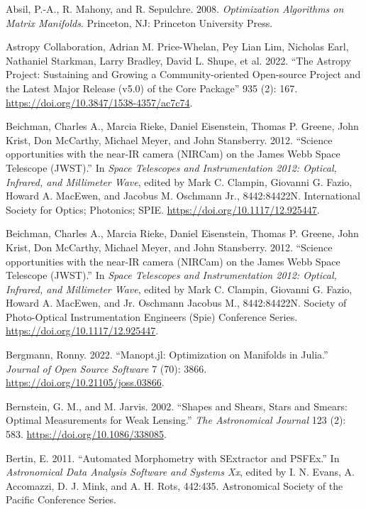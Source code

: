 \documentclass[10pt,a4paper,onecolumn]{article}
\begin{document}
\hypertarget{refs}{}
\begin{cslreferences}
\leavevmode\hypertarget{ref-AbsMahSep2008}{}%
Absil, P.-A., R. Mahony, and R. Sepulchre. 2008. \emph{Optimization
Algorithms on Matrix Manifolds}. Princeton, NJ: Princeton University
Press.

\leavevmode\hypertarget{ref-2022ApJ}{}%
Astropy Collaboration, Adrian M. Price-Whelan, Pey Lian Lim, Nicholas
Earl, Nathaniel Starkman, Larry Bradley, David L. Shupe, et al. 2022.
``The Astropy Project: Sustaining and Growing a Community-oriented
Open-source Project and the Latest Major Release (v5.0) of the Core
Package'' 935 (2): 167. \url{https://doi.org/10.3847/1538-4357/ac7c74}.

\leavevmode\hypertarget{ref-10.1117ux2f12.925447}{}%
Beichman, Charles A., Marcia Rieke, Daniel Eisenstein, Thomas P. Greene,
John Krist, Don McCarthy, Michael Meyer, and John Stansberry. 2012.
``Science opportunities with the near-IR camera (NIRCam) on the James
Webb Space Telescope (JWST).'' In \emph{Space Telescopes and
Instrumentation 2012: Optical, Infrared, and Millimeter Wave}, edited by
Mark C. Clampin, Giovanni G. Fazio, Howard A. MacEwen, and Jacobus M.
Oschmann Jr., 8442:84422N. International Society for Optics; Photonics;
SPIE. \url{https://doi.org/10.1117/12.925447}.

\leavevmode\hypertarget{ref-BSPIE}{}%
Beichman, Charles A., Marcia Rieke, Daniel Eisenstein, Thomas P. Greene,
John Krist, Don McCarthy, Michael Meyer, and John Stansberry. 2012.
``Science opportunities with the near-IR camera (NIRCam) on the James
Webb Space Telescope (JWST).'' In \emph{Space Telescopes and
Instrumentation 2012: Optical, Infrared, and Millimeter Wave}, edited by
Mark C. Clampin, Giovanni G. Fazio, Howard A. MacEwen, and Jr. Oschmann
Jacobus M., 8442:84422N. Society of Photo-Optical Instrumentation
Engineers (Spie) Conference Series.
\url{https://doi.org/10.1117/12.925447}.

\leavevmode\hypertarget{ref-Bergmann2022}{}%
Bergmann, Ronny. 2022. ``Manopt.jl: Optimization on Manifolds in
Julia.'' \emph{Journal of Open Source Software} 7 (70): 3866.
\url{https://doi.org/10.21105/joss.03866}.

\leavevmode\hypertarget{ref-Bernstein_2002}{}%
Bernstein, G. M., and M. Jarvis. 2002. ``Shapes and Shears, Stars and
Smears: Optimal Measurements for Weak Lensing.'' \emph{The Astronomical
Journal} 123 (2): 583. \url{https://doi.org/10.1086/338085}.

\leavevmode\hypertarget{ref-2011ASPC}{}%
Bertin, E. 2011. ``Automated Morphometry with SExtractor and PSFEx.'' In
\emph{Astronomical Data Analysis Software and Systems Xx}, edited by I.
N. Evans, A. Accomazzi, D. J. Mink, and A. H. Rots, 442:435.
Astronomical Society of the Pacific Conference Series.


\end{cslreferences}
\end{document}
